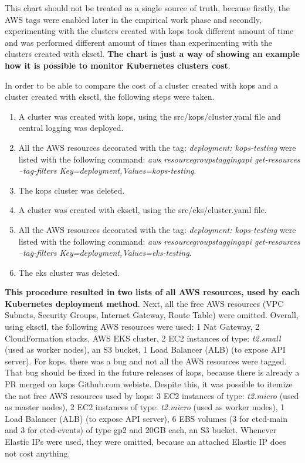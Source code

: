 This chart should not be treated as a single source of truth, because firstly, the AWS tags were enabled later in the empirical work phase and secondly, experimenting with the clusters created with kops took different amount of time and was performed different amount of times than experimenting with the clusters created with eksctl. \textbf{The chart is just a way of showing an example how it is possible to monitor Kubernetes clusters cost}.

In order to be able to compare the cost of a cluster created with kops and a cluster created with eksctl, the following steps were taken.
\begin{enumerate}
\item A cluster was created with kops, using the src/kops/cluster.yaml file and central logging was deployed.
\item All the AWS resources decorated with the tag: \textit{deployment: kops-testing} were listed with the following command: \textit{aws resourcegroupstaggingapi get-resources --tag-filters Key=deployment,Values=kops-testing}.
\item The kops cluster was deleted.
\item A cluster was created with eksctl, using the src/eks/cluster.yaml file.
\item All the AWS resources decorated with the tag: \textit{deployment: kops-testing} were listed with the following command: \textit{aws resourcegroupstaggingapi get-resources --tag-filters Key=deployment,Values=eks-testing}.
\item The eks cluster was deleted.
\end{enumerate}

\textbf{This procedure resulted in two lists of all AWS resources, used by each Kubernetes deployment method}. Next, all the free AWS resources (VPC Subnets, Security Groups, Internet Gateway, Route Table) were omitted. Overall, using eksctl, the following AWS resources were used: 1 Nat Gateway, 2 CloudFormation stacks, AWS EKS cluster, 2 EC2 instances of type: \textit{t2.small} (used as worker nodes), an S3 bucket, 1 Load Balancer (ALB) (to expose API server). For kops, there was a bug and not all the AWS resources were tagged\cite{kops-issue-tags}. That bug should be fixed in the future releases of kops, because there is already a PR merged on kops Github.com webiste\cite{kops-issue-tags-pr}. Despite this, it was possible to itemize the not free AWS resources used by kops: 3 EC2 instances of type: \textit{t2.micro} (used as master nodes), 2 EC2 instances of type: \textit{t2.micro} (used as worker nodes), 1 Load Balancer (ALB) (to expose API server), 6 EBS volumes (3 for etcd-main and 3 for etcd-events) of type gp2 and 20GB each, an S3 bucket. Whenever Elastic IPs were used, they were omitted, because an attached Elastic IP does not cost anything.

